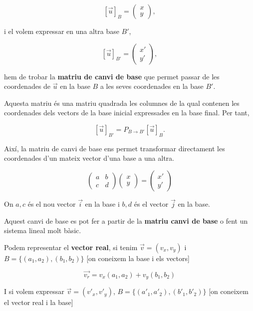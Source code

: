 \documentclass[12pt]{article}
\begin{document}
\[
[\vec{u}]_B=
\begin{pmatrix}
x\\
y
\end{pmatrix},
\]

i el volem expressar en una altra base \(B'\),

\[
[\vec{u}]_{B'}=
\begin{pmatrix}
x'\\
y'
\end{pmatrix},
\]

hem de trobar la \textbf{matriu de canvi de base} que permet passar de les coordenades de \(\vec{u}\) en la base \(B\) a les seves coordenades en la base \(B'\).

Aquesta matriu és una matriu quadrada les columnes de la qual contenen les coordenades dels vectors de la base inicial expressades en la base final. Per tant,

\[
[\vec{u}]_{B'}=P_{B\to B'}[\vec{u}]_B.
\]

Així, la matriu de canvi de base ens permet transformar directament les coordenades d'un mateix vector d'una base a una altra.

\[\begin{pmatrix}
    a & b\\
    c & d
\end{pmatrix} \begin{pmatrix}
    x \\ 
    y
\end{pmatrix} = \begin{pmatrix}
    x'\\
    y'
\end{pmatrix}\]

On $a,c$ és el nou vector $\vec{i}$ en la base i $b,d$ és el vector $\vec{j}$ en la base.

Aquest canvi de base es pot fer a partir de la \textbf{matriu canvi de base} o fent un sistema lineal molt bàsic.

Podem representar el \textbf{vector real}, si tenim $\vec{v} = (v_x, v_y)$ i $B = \{(a_1, a_2), (b_1, b_2)\}$ [on coneixem la base i els vectors]

\[\vec{v_r} = v_x(a_1, a_2) + v_y(b_1,b_2)\]

I si volem expressar $\vec{v} = (v'_x, v'_y)$, $B = \{(a'_1, a'_2), (b'_1, b'_2)\}$ [on coneixem el vector real i la base] 
\end{document}
